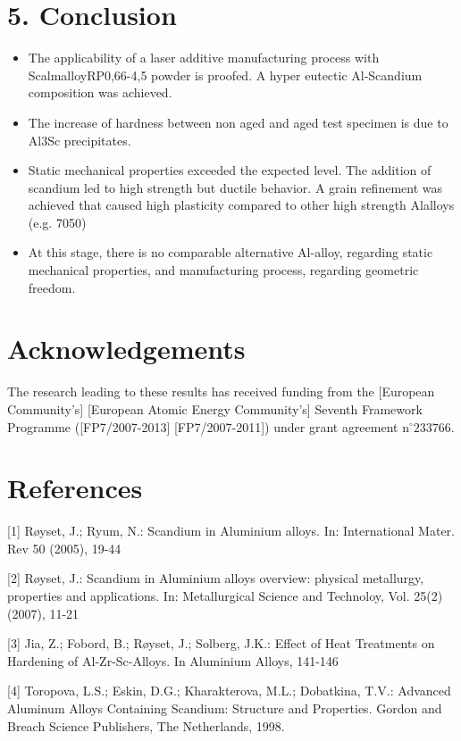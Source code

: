 \documentclass[10pt]{article}
\begin{document}
\section*{5. Conclusion}
\begin{itemize}
  \item The applicability of a laser additive manufacturing process with ScalmalloyRP0,66-4,5 powder is proofed. A hyper eutectic Al-Scandium composition was achieved.
  \item The increase of hardness between non aged and aged test specimen is due to Al3Sc precipitates.
  \item Static mechanical properties exceeded the expected level. The addition of scandium led to high strength but ductile behavior. A grain refinement was achieved that caused high plasticity compared to other high strength Alalloys (e.g. 7050)
  \item At this stage, there is no comparable alternative Al-alloy, regarding static mechanical properties, and manufacturing process, regarding geometric freedom.
\end{itemize}

\section*{Acknowledgements}
The research leading to these results has received funding from the [European Community's] [European Atomic Energy Community’s] Seventh Framework Programme ([FP7/2007-2013] [FP7/2007-2011]) under grant agreement $\mathrm{n}^{\circ} 233766$.

\section*{References}
[1] Røyset, J.; Ryum, N.: Scandium in Aluminium alloys. In: International Mater. Rev 50 (2005), 19-44

[2] Røyset, J.: Scandium in Aluminium alloys overview: physical metallurgy, properties and applications. In: Metallurgical Science and Technoloy, Vol. 25(2) (2007), 11-21

[3] Jia, Z.; Fobord, B.; Røyset, J.; Solberg, J.K.: Effect of Heat Treatments on Hardening of Al-Zr-Sc-Alloys. In Aluminium Alloys, 141-146

[4] Toropova, L.S.; Eskin, D.G.; Kharakterova, M.L.; Dobatkina, T.V.: Advanced Aluminum Alloys Containing Scandium: Structure and Properties. Gordon and Breach Science Publishers, The Netherlands, 1998.
\end{document}
